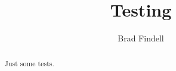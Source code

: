 \documentclass[handout,space,nooutcomes]{xourse}
\title{Testing}
\author{Brad Findell}
\begin{document}
\begin{abstract}
Just some tests.  
\end{abstract}
\maketitle

{}
\end{document}
